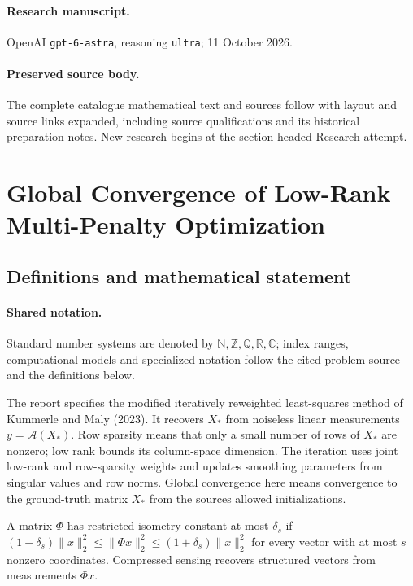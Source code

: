 \documentclass[11pt]{article}
\begin{document}
\paragraph{Research manuscript.} OpenAI \texttt{gpt-6-astra}, reasoning \texttt{ultra}; 11 October 2026.
\paragraph{Preserved source body.} The complete catalogue mathematical text and sources follow with layout and source links expanded, including source qualifications and its historical preparation notes. New research begins at the section headed Research attempt.

\section{Global Convergence of Low-Rank Multi-Penalty Optimization}\label{statement}

\subsection{Definitions and mathematical statement}

\paragraph{Shared notation.}Standard number systems are denoted by $\mathbb N,\mathbb Z,\mathbb Q,\mathbb R,\mathbb C$; index ranges, computational models and specialized notation follow the cited problem source and the definitions below.


The report specifies the modified iteratively reweighted least-squares method of Kummerle and Maly (2023). It recovers $X_*$ from noiseless linear measurements $y=\mathcal A(X_*)$. Row sparsity means that only a small number of rows of $X_*$ are nonzero; low rank bounds its column-space dimension. The iteration uses joint low-rank and row-sparsity weights and updates smoothing parameters from singular values and row norms. Global convergence here means convergence to the ground-truth matrix $X_*$ from the source\textquotesingle s allowed initializations.

A matrix $\Phi$ has restricted-isometry constant at most $\delta_s$ if $(1-\delta_s)\lVert x\rVert_2^2\leq\lVert\Phi x\rVert_2^2\leq(1+\delta_s)\lVert x\rVert_2^2$ for every vector with at most $s$ nonzero coordinates. Compressed sensing recovers structured vectors from measurements $\Phi x$.
\end{document}
